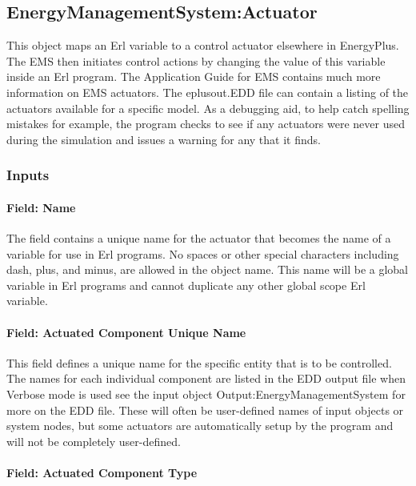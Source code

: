 \subsection{EnergyManagementSystem:Actuator}\label{energymanagementsystemactuator}

This object maps an Erl variable to a control actuator elsewhere in EnergyPlus. The EMS then initiates control actions by changing the value of this variable inside an Erl program. The Application Guide for EMS contains much more information on EMS actuators. The eplusout.EDD file can contain a listing of the actuators available for a specific model.  As a debugging aid, to help catch spelling mistakes for example, the program checks to see if any actuators were never used during the simulation and issues a warning for any that it finds. 

\subsubsection{Inputs}\label{inputs-1-013}

\paragraph{Field: Name}\label{field-name-1-012}

The field contains a unique name for the actuator that becomes the name of a variable for use in Erl programs. No spaces or other special characters including dash, plus, and minus, are allowed in the object name. This name will be a global variable in Erl programs and cannot duplicate any other global scope Erl variable.

\paragraph{Field: Actuated Component Unique Name}\label{field-actuated-component-unique-name}

This field defines a unique name for the specific entity that is to be controlled. The names for each individual component are listed in the EDD output file when Verbose mode is used see the input object Output:EnergyManagementSystem for more on the EDD file. These will often be user-defined names of input objects or system nodes, but some actuators are automatically setup by the program and will not be completely user-defined.

\paragraph{Field: Actuated Component Type}\label{field-actuated-component-type}

